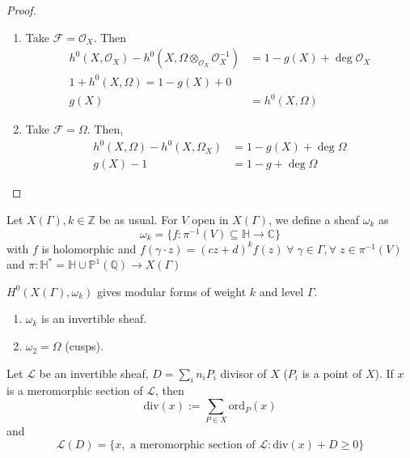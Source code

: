 \documentclass[oneside, 12pt]{scrbook}
\newcommand{\CC}{\mathbb C}
\newcommand{\QQ}{\mathbb Q}
\newcommand{\ZZ}{\mathbb Z}
\newcommand{\PP}{\mathbb{P}}
\newcommand{\ord}{\mathrm{ord}}
\theoremstyle{theorem}
\begin{document}
\begin{proof}
\begin{enumerate}
\item Take $\mathcal{F}  = \mathcal{O}_{X}$. Then 
\begin{align*}
h^{0}(X, \mathcal{O}_{X}) - h^{0}(X, \Omega \otimes_{\mathcal{O}_{X}} \mathcal{O}_{X}^{-1}) &= 1 - g(X) + \deg \mathcal{O}_{X} \\
1 + h^{0}(X, \Omega) = 1- g(X) + 0\\
g(X) &= h^{0}(X,\Omega)
\end{align*}
\item Take $\mathcal{F} = \Omega$. Then, 
\begin{align*}
h^{0}(X, \Omega) - h^{0}(X, \Omega_{X}) &= 1 - g(X) + \deg \Omega \\
g(X) - 1 &= 1-g + \deg \Omega
\end{align*}
\end{enumerate}
\end{proof}

\begin{lemma}

\end{lemma}

\begin{definition}
Let $X(\Gamma), k \in \ZZ$ be as usual. For $V$ open in $X(\Gamma)$, we define a sheaf $\omega_{k}$ as $$\omega_{k} = \{f: \pi^{-1}(V) \subseteq \mathbb{H} \rightarrow \CC\}$$ with $f$ is holomorphic and $f(\gamma \cdot z) = (cz+d)^k f(z) \; \forall \; \gamma \in \Gamma, \forall \; z \in \pi^{-1}(V)$ and $\pi: \mathbb{H}^{*} = \mathbb{H} \cup \PP^{1}(\QQ) \rightarrow X(\Gamma)$ 
\end{definition}

\begin{remark}
$H^{0}(X(\Gamma), \omega_{k})$ gives modular forms of weight $k$ and level $\Gamma$. 
\end{remark}

\begin{theorem}
\begin{enumerate}
\item $\omega_{k}$ is an invertible sheaf.
\item $\omega_{2} = \Omega$ (cusps).
\end{enumerate}
\end{theorem}

Let $\mathcal{L}$ be an invertible sheaf, $D =\sum_{i} n_{i}P_{i}$ divisor of $X$ ($P_{i}$ is a point of $X$). If $x$ is a meromorphic section of $\mathcal{L}$, then $$\mathrm{div}(x) := \sum_{P \in X} \ord_{P}(x)$$ and $$\mathcal{L}(D) = \{x, \text{ a meromorphic section of }\mathcal{L}: \mathrm{div}(x) + D \geq 0\}$$
\end{document}
